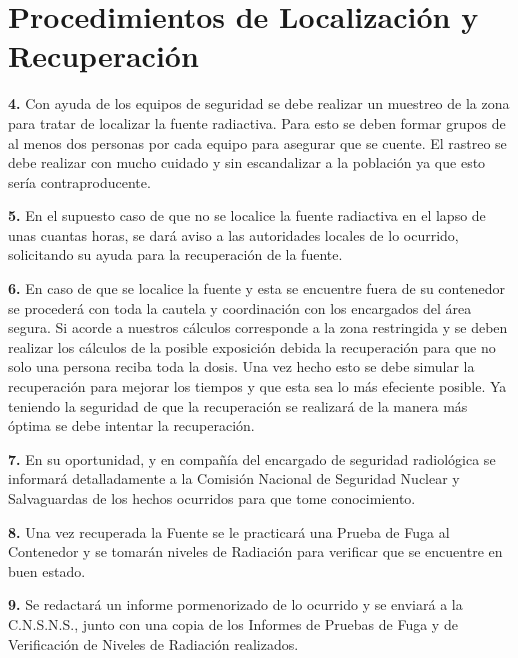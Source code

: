\section*{Procedimientos de Localización y Recuperación}

\textbf{4.} Con ayuda de los equipos de seguridad se debe realizar un muestreo de la zona para tratar de localizar la fuente radiactiva. Para esto se deben formar grupos de al menos dos personas por cada equipo para asegurar que se cuente. El rastreo se debe realizar con mucho cuidado y sin escandalizar a la población ya que esto sería contraproducente.

\textbf{5.} En el supuesto caso de que no se localice la fuente radiactiva en el lapso de unas cuantas horas, se dará aviso a las autoridades locales de lo ocurrido, solicitando su ayuda para la recuperación de la fuente.

\textbf{6.} En caso de que se localice la fuente y esta se encuentre fuera de su contenedor se procederá con toda la cautela y coordinación con los encargados del área segura. Si acorde a nuestros cálculos corresponde a la zona restringida y se deben realizar los cálculos de la posible exposición debida la recuperación para que no solo una persona reciba toda la dosis. Una vez hecho esto se debe simular la recuperación para mejorar los tiempos y que esta sea lo más efeciente posible. Ya teniendo la seguridad de que la recuperación se realizará de la manera más óptima se debe intentar la recuperación.

\textbf{7.} En su oportunidad, y en compañía del encargado de seguridad radiológica se informará detalladamente a la Comisión Nacional de Seguridad Nuclear y Salvaguardas de los hechos ocurridos para que tome conocimiento.

\textbf{8.} Una vez recuperada la Fuente se le practicará una Prueba de Fuga al Contenedor y se tomarán niveles de Radiación para verificar que se encuentre en buen estado.

\textbf{9.} Se redactará un informe pormenorizado de lo ocurrido y se enviará a la C.N.S.N.S., junto con una copia de los Informes de Pruebas de Fuga y de Verificación de Niveles de Radiación realizados.